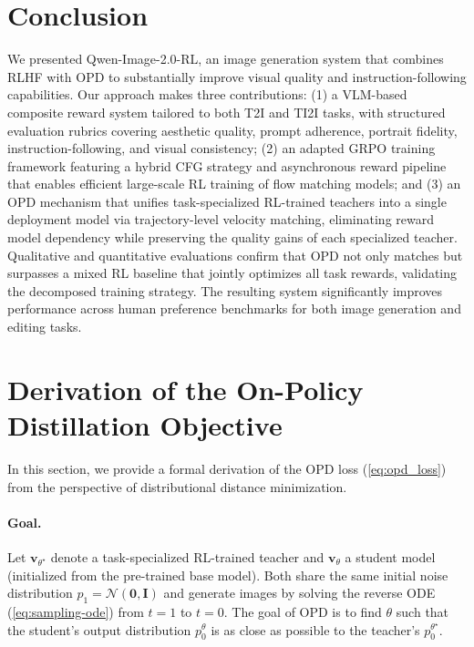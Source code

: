 \documentclass{article} %
\renewcommand{\mathbf}[1]{\bm{#1}}
\begin{document}
\section{Conclusion}

We presented Qwen-Image-2.0-RL, an image generation system that combines RLHF with OPD to substantially improve visual quality and instruction-following capabilities. Our approach makes three contributions: (1) a VLM-based composite reward system tailored to both T2I and TI2I tasks, with structured evaluation rubrics covering aesthetic quality, prompt adherence, portrait fidelity, instruction-following, and visual consistency; (2) an adapted GRPO training framework featuring a hybrid CFG strategy and asynchronous reward pipeline that enables efficient large-scale RL training of flow matching models; and (3) an OPD mechanism that unifies task-specialized RL-trained teachers into a single deployment model via trajectory-level velocity matching, eliminating reward model dependency while preserving the quality gains of each specialized teacher. Qualitative and quantitative evaluations confirm that OPD not only matches but surpasses a mixed RL baseline that jointly optimizes all task rewards, validating the decomposed training strategy. The resulting system significantly improves performance across human preference benchmarks for both image generation and editing tasks.


\clearpage
\appendix

\section{Derivation of the On-Policy Distillation Objective}
\label{app:opd_derivation}

In this section, we provide a formal derivation of the OPD loss (\cref{eq:opd_loss}) from the perspective of distributional distance minimization.

\paragraph{Goal.} Let $\mathbf{v}_{\theta^\star}$ denote a task-specialized RL-trained teacher and $\mathbf{v}_\theta$ a student model (initialized from the pre-trained base model). Both share the same initial noise distribution $p_1 = \mathcal{N}(\mathbf{0}, \mathbf{I})$ and generate images by solving the reverse ODE (\cref{eq:sampling-ode}) from $t=1$ to $t=0$. The goal of OPD is to find $\theta$ such that the student's output distribution $p_0^\theta$ is as close as possible to the teacher's $p_0^{\theta^\star}$.
\end{document}
